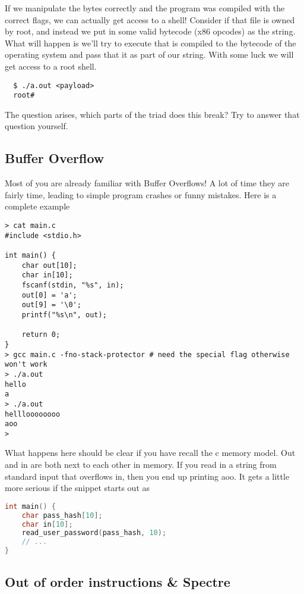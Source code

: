If we manipulate the bytes correctly and the program was compiled with the correct flags, we can actually get access to a shell!
Consider if that file is owned by root, and instead we put in some valid bytecode (x86 opcodes) as the string.
What will happen is we'll try to execute  that is compiled to the bytecode of the operating system and pass that it as part of our string.
With some luck we will get access to a root shell.

\begin{lstlisting}
  $ ./a.out <payload>
  root#
\end{lstlisting}

The question arises, which parts of the triad does this break?
Try to answer that question yourself.

\subsection{Buffer Overflow}

Most of you are already familiar with Buffer Overflows!
A lot of time they are fairly time, leading to simple program crashes or funny mistakes.
Here is a complete example

\begin{lstlisting}
> cat main.c
#include <stdio.h>

int main() {
    char out[10];
    char in[10];
    fscanf(stdin, "%s", in);
    out[0] = 'a';
    out[9] = '\0';
    printf("%s\n", out);

    return 0;
}
> gcc main.c -fno-stack-protector # need the special flag otherwise won't work
> ./a.out
hello
a
> ./a.out
hellloooooooo
aoo
>
\end{lstlisting}

What happens here should be clear if you have recall the c memory model.
Out and in are both next to each other in memory.
If you read in a string from standard input that overflows in, then you end up printing aoo.
It gets a little more serious if the snippet starts out as

\begin{lstlisting}[language=C]
int main() {
    char pass_hash[10];
    char in[10];
    read_user_password(pass_hash, 10);
    // ...
}
\end{lstlisting}

\subsection{Out of order instructions \& Spectre}

